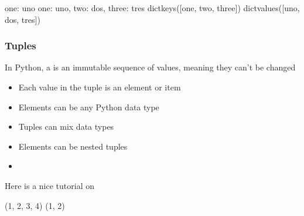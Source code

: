 \documentclass[letterpaper,10pt,english]{sphinxmanual}
\begin{document}
\begin{sphinxVerbatim}[commandchars=\\\{\}]
\PYGZob{}\PYGZsq{}one\PYGZsq{}: \PYGZsq{}uno\PYGZsq{}\PYGZcb{}
\PYGZob{}\PYGZsq{}one\PYGZsq{}: \PYGZsq{}uno\PYGZsq{}, \PYGZsq{}two\PYGZsq{}: \PYGZsq{}dos\PYGZsq{}, \PYGZsq{}three\PYGZsq{}: \PYGZsq{}tres\PYGZsq{}\PYGZcb{}
dict\PYGZus{}keys([\PYGZsq{}one\PYGZsq{}, \PYGZsq{}two\PYGZsq{}, \PYGZsq{}three\PYGZsq{}])
dict\PYGZus{}values([\PYGZsq{}uno\PYGZsq{}, \PYGZsq{}dos\PYGZsq{}, \PYGZsq{}tres\PYGZsq{}])
\end{sphinxVerbatim}


\subsubsection{Tuples}
\label{\detokenize{content/Introduction_to_Programming:tuples}}
In Python, a  is an immutable sequence of values, meaning they can’t be changed
\begin{itemize}
\item {} 
Each value in the tuple is an element or item

\item {} 
Elements can be any Python data type

\item {} 
Tuples can mix data types

\item {} 
Elements can be nested tuples

\item {} 

\end{itemize}

Here is a nice tutorial on 

\begin{sphinxVerbatim}[commandchars=\\\{\}]
     

   
\end{sphinxVerbatim}

\begin{sphinxVerbatim}[commandchars=\\\{\}]
(1, 2, 3, 4)
(1, 2)
\end{sphinxVerbatim}
\end{document}
